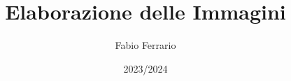 \documentclass[12pt, a4paper, openany]{book}
\begin{document}
\title{Elaborazione delle Immagini}
\author{Fabio Ferrario}
\date{2023/2024}
\maketitle

\tableofcontents


\end{document}
